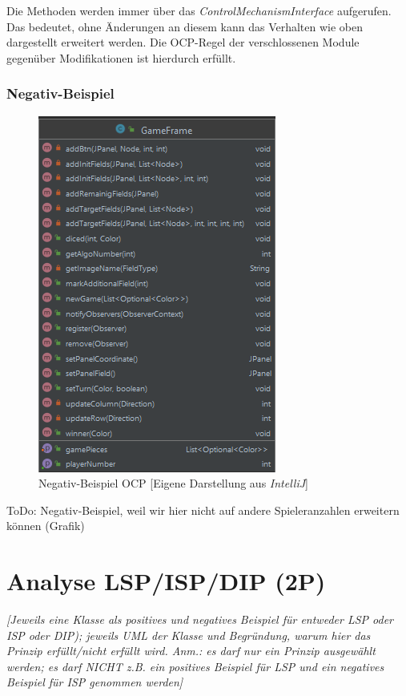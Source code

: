 Die Methoden werden immer über das \emph{ControlMechanismInterface} aufgerufen. Das bedeutet, ohne Änderungen an diesem kann das Verhalten wie oben dargestellt erweitert werden. Die OCP-Regel der verschlossenen Module gegenüber Modifikationen ist hierdurch erfüllt.

\subsubsection{Negativ-Beispiel}
\begin{figure}[htbp]
\centering
\centerline{\includegraphics[scale=.6]{negativbeispiel_ocp}}
\caption{Negativ-Beispiel OCP [Eigene Darstellung aus \emph{IntelliJ}]}
\label{fig:negativbeispiel_ocp}
\end{figure}
\noindent ToDo: Negativ-Beispiel, weil wir hier nicht auf andere Spieleranzahlen erweitern können (Grafik)

\newpage
\section{Analyse LSP/ISP/DIP (2P)}
\emph{[Jeweils eine Klasse als positives und negatives Beispiel für entweder LSP oder ISP oder DIP); jeweils
UML der Klasse und Begründung, warum hier das Prinzip erfüllt/nicht erfüllt wird. Anm.: es darf nur ein Prinzip ausgewählt werden; es darf NICHT z.B. ein positives Beispiel für LSP und ein negatives Beispiel für ISP genommen werden]}

